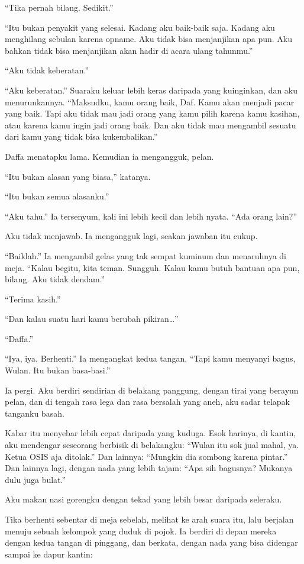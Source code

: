\documentclass[11pt,twoside,openany]{book}
\makeatletter
\newcommand{\scenebreak}{\par\vspace{0.9em}{\centering\textsc{*\hspace{0.7em}*\hspace{0.7em}*}\par}\vspace{0.9em}\@afterindentfalse\@afterheading}
\makeatother
\begin{document}
``Tika pernah bilang. Sedikit.''

``Itu bukan penyakit yang selesai. Kadang aku baik-baik saja. Kadang aku menghilang sebulan karena opname. Aku tidak bisa menjanjikan apa pun. Aku bahkan tidak bisa menjanjikan akan hadir di acara ulang tahunmu.''

``Aku tidak keberatan.''

``Aku keberatan.'' Suaraku keluar lebih keras daripada yang kuinginkan, dan aku menurunkannya. ``Maksudku, kamu orang baik, Daf. Kamu akan menjadi pacar yang baik. Tapi aku tidak mau jadi orang yang kamu pilih karena kamu kasihan, atau karena kamu ingin jadi orang baik. Dan aku tidak mau mengambil sesuatu dari kamu yang tidak bisa kukembalikan.''

Daffa menatapku lama. Kemudian ia mengangguk, pelan.

``Itu bukan alasan yang biasa,'' katanya.

``Itu bukan semua alasanku.''

``Aku tahu.'' Ia tersenyum, kali ini lebih kecil dan lebih nyata. ``Ada orang lain?''

Aku tidak menjawab. Ia mengangguk lagi, seakan jawaban itu cukup.

``Baiklah.'' Ia mengambil gelas yang tak sempat kuminum dan menaruhnya di meja. ``Kalau begitu, kita teman. Sungguh. Kalau kamu butuh bantuan apa pun, bilang. Aku tidak dendam.''

``Terima kasih.''

``Dan kalau suatu hari kamu berubah pikiran\ldots{}''

``Daffa.''

``Iya, iya. Berhenti.'' Ia mengangkat kedua tangan. ``Tapi kamu menyanyi bagus, Wulan. Itu bukan basa-basi.''

Ia pergi. Aku berdiri sendirian di belakang panggung, dengan tirai yang berayun pelan, dan di tengah rasa lega dan rasa bersalah yang aneh, aku sadar telapak tanganku basah.

\scenebreak
Kabar itu menyebar lebih cepat daripada yang kuduga. Esok harinya, di kantin, aku mendengar seseorang berbisik di belakangku: ``Wulan itu sok jual mahal, ya. Ketua OSIS aja ditolak.'' Dan lainnya: ``Mungkin dia sombong karena pintar.'' Dan lainnya lagi, dengan nada yang lebih tajam: ``Apa sih bagusnya? Mukanya dulu juga bulat.''

Aku makan nasi gorengku dengan tekad yang lebih besar daripada seleraku.

Tika berhenti sebentar di meja sebelah, melihat ke arah suara itu, lalu berjalan menuju sebuah kelompok yang duduk di pojok. Ia berdiri di depan mereka dengan kedua tangan di pinggang, dan berkata, dengan nada yang bisa didengar sampai ke dapur kantin:
\end{document}
